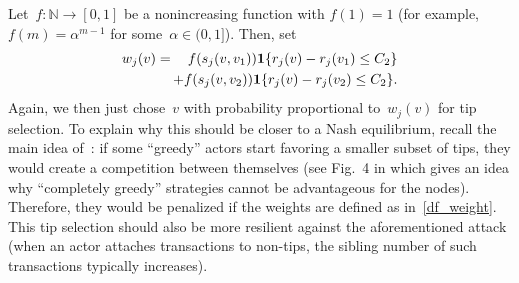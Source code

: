 \documentclass[../main.tex]{subfiles}
\begin{document}
Let~$f:\mathbb{N}\to[0,1]$ be a nonincreasing function
with $f(1)=1$ (for example, $f(m)=\alpha^{m-1}$ for 
some~$\alpha\in (0,1]$).
Then, set
\begin{eqnarray}
\label{df_weight}
 w_j(v) &=& f(s_j(v,v_1))\mathbf{1}\{r_j(v) - r_j(v_1)\leq C_2\} \\ &&\!\!\!\!\!
  + f(s_j(v,v_2))\mathbf{1}\{r_j(v) - r_j(v_2)\leq C_2\} . \nonumber
\end{eqnarray}
Again, we then just chose~$v$ 
with probability proportional to~$w_j(v)$ for tip selection.
To explain why this should be closer to a Nash equilibrium,
recall the main idea of~\cite{popovSaaFinardi2017}:
if some ``greedy'' actors start favoring a smaller
subset of tips, they would create a competition between themselves (see Fig.~4 in \cite{popovSaaFinardi2017} which gives an idea
why ``completely greedy'' strategies cannot be advantageous for the nodes). Therefore, they would be penalized if the weights are defined as 
in~\eqref{df_weight}. 
This tip selection should also be more resilient against the aforementioned
attack (when an actor attaches transactions to non-tips, the sibling
number of such transactions typically increases).
\end{document}
